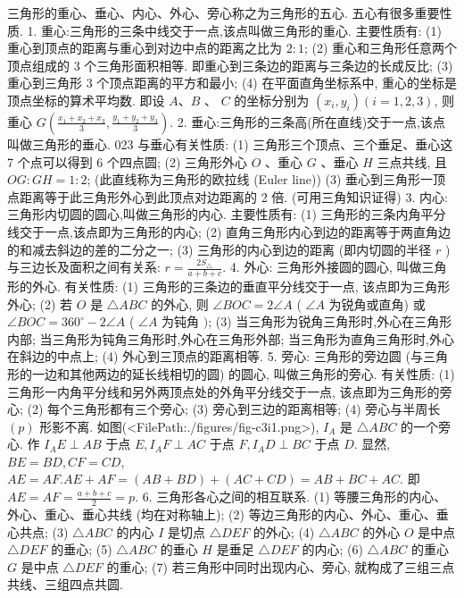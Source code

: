 
三角形的重心、垂心、内心、外心、旁心称之为三角形的五心.
五心有很多重要性质.
1. 重心:三角形的三条中线交于一点,该点叫做三角形的重心.
主要性质有:
(1) 重心到顶点的距离与重心到对边中点的距离之比为 $2: 1$;
(2) 重心和三角形任意两个顶点组成的 3 个三角形面积相等.
即重心到三条边的距离与三条边的长成反比;
(3) 重心到三角形 3 个顶点距离的平方和最小;
(4) 在平面直角坐标系中, 重心的坐标是顶点坐标的算术平均数.
即设 $A 、 B$ 、 $C$ 的坐标分别为 $\left(x_i, y_i\right)(i=1,2,3)$, 则重心 $G\left(\frac{x_1+x_2+x_3}{3}, \frac{y_1+y_2+y_3}{3}\right)$.
2. 垂心:三角形的三条高(所在直线)交于一点,该点叫做三角形的垂心.
023 与垂心有关性质:
(1) 三角形三个顶点、三个垂足、垂心这 7 个点可以得到 6 个四点圆;
(2) 三角形外心 $O$ 、重心 $G$ 、垂心 $H$ 三点共线, 且 $O G: G H=1: 2$; (此直线称为三角形的欧拉线 (Euler line))
(3) 垂心到三角形一顶点距离等于此三角形外心到此顶点对边距离的 2 倍.
(可用三角知识证得)
3. 内心: 三角形内切圆的圆心,叫做三角形的内心.
主要性质有:
(1) 三角形的三条内角平分线交于一点,该点即为三角形的内心;
(2) 直角三角形内心到边的距离等于两直角边的和减去斜边的差的二分之一;
(3) 三角形的内心到边的距离 (即内切圆的半径 $r$ ) 与三边长及面积之间有关系: $r=\frac{2 S_{\triangle}}{a+b+c}$.
4. 外心: 三角形外接圆的圆心, 叫做三角形的外心.
有关性质:
(1) 三角形的三条边的垂直平分线交于一点, 该点即为三角形外心;
(2) 若 $O$ 是 $\triangle A B C$ 的外心, 则 $\angle B O C=2 \angle A$ ( $\angle A$ 为锐角或直角) 或
$\angle B O C=360^{\circ}-2 \angle A$ ( $\angle A$ 为钝角 $)$;
(3) 当三角形为锐角三角形时,外心在三角形内部; 当三角形为钝角三角形时,外心在三角形外部; 当三角形为直角三角形时,外心在斜边的中点上;
(4) 外心到三顶点的距离相等.
5. 旁心: 三角形的旁边圆 (与三角形的一边和其他两边的延长线相切的圆) 的圆心, 叫做三角形的旁心.
有关性质:
(1) 三角形一内角平分线和另外两顶点处的外角平分线交于一点, 该点即为三角形的旁心;
(2) 每个三角形都有三个旁心;
(3) 旁心到三边的距离相等;
(4) 旁心与半周长 $(p)$ 形影不离.
如图(<FilePath:./figures/fig-c3i1.png>), $I_A$ 是 $\triangle A B C$ 的一个旁心.
作 $I_A E \perp A B$ 于点 $E, I_A F \perp A C$ 于点 $F, I_A D \perp B C$ 于点 $D$. 显然, $B E=B D, C F=C D$, $A E=A F . A E+A F=(A B+B D)+(A C+C D)= A B+B C+A C$. 即 $A E=A F=\frac{a+b+c}{2}=p$.
6. 三角形各心之间的相互联系.
(1) 等腰三角形的内心、外心、重心、垂心共线 (均在对称轴上);
(2) 等边三角形的内心、外心、重心、垂心共点;
(3) $\triangle A B C$ 的内心 $I$ 是切点 $\triangle D E F$ 的外心;
(4) $\triangle A B C$ 的外心 $O$ 是中点 $\triangle D E F$ 的垂心;
(5) $\triangle A B C$ 的垂心 $H$ 是垂足 $\triangle D E F$ 的内心;
(6) $\triangle A B C$ 的重心 $G$ 是中点 $\triangle D E F$ 的重心;
(7) 若三角形中同时出现内心、旁心, 就构成了三组三点共线、三组四点共圆.
